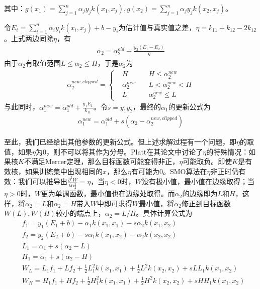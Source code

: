         其中：$g(x_1) = \sum\limits_{j=1}^n \alpha_jy_jk(x_1,x_j), g(x_2) = \sum\limits_{j=1}^n \alpha_jy_jk(x_2,x_j)$。
        \par
        令$E_i = \sum_{i=1}^n\alpha_iy_ik(x_i,x_j)+b-y_i$为估计值与真实值之差，$\eta = k_{11}+k_{12}-2k_{12}$。上式两边同除$\eta$，有
        \begin{align*}
        \alpha_2 = \alpha_2^{old}+\frac{y_2(E_1-E_2)}{\eta}
        \end{align*}
        由于$\alpha_2$有取值范围$L \leqslant \alpha_2 \leqslant H$，于是$\alpha_2$为
        \begin{align*}
        \alpha_2^{new,clipped} = \left\{
        \begin{aligned}
        & H\quad&  H \leqslant \alpha_2^{new}\\
        & \alpha_2^{new}\quad&  L < \alpha_2^{new} <H\\
        & L \quad&  \alpha_2^{new} \leqslant L
        \end{aligned}
        \right.
        \end{align*}
        与此同时，$\alpha_1^{new} = \alpha_1^{old}+\frac{y_1E_1}{k_{11}}$。令$s= y_1y_2$，最终的$\alpha_1$的更新公式为
        \begin{align*}
        \alpha_1^{new} = \alpha_1^{old}+s(\alpha_2-\alpha_2^{new,clipped})
        \end{align*}
        \par
        至此，我们已经给出其他参数的更新公式。但上述求解过程有一个问题，即$\eta$的取值，如果$\eta $为0，则不可以将其作为分母。Platt在其论文中讨论了$\eta$的特殊情况：如果核$K$不满足Mercer定理，那么目标函数可能变得非正，$\eta$可能取负。即使$K$是有效核，如果训练集中出现相同的$x$，那么$\eta$有可能为0。SMO算法在$\eta$非正时仍有效：我们可以推导出$\frac{\partial^2 W}{\partial \alpha_2^2}=\eta$，当$\eta<0$时，$W$没有极小值，最小值在边缘取得；当$\eta>0$时，$W$更为单调函数，最小值也在边缘处取得。而$\alpha_2$的边缘即为$L$和$H$，这样，将$\alpha_2 = L$和$\alpha_2 = H$带入$W$中即可求得$W$最小值，将$\alpha_2$修正到目标函数$W(L),W(H)$较小的端点上，$\alpha_2 = L/H$。具体计算公式为
        \begin{align*}
        & f_1 = y_1(E_1+b)-\alpha_1k(x_1,x_1)-s\alpha_2k(x_1,x_2)\\
        & f_2 = y_2(E_2+b)-s\alpha_1k(x_1,x_2)-\alpha_2k(x_2,x_2)\\
        & L_1 = \alpha_1+s(\alpha_2-L)\\
        & H_1 = \alpha_1 + s(\alpha_2-H)\\
        & W_L = L_1f_1+L f_2+\frac{1}{2}L_1^2k(x_1,x_1)+\frac{1}{2}L^2k(x_2,x_2)+sLL_1k(x_1,x_2)\\
        & W_H = H_1f_1+Hf_2+\frac{1}{2}H_1^2k(x_1,x_1)+\frac{1}{2}H^2k(x_2,x_2)+sHH_1k(x_1,x_2)
        \end{align*}
